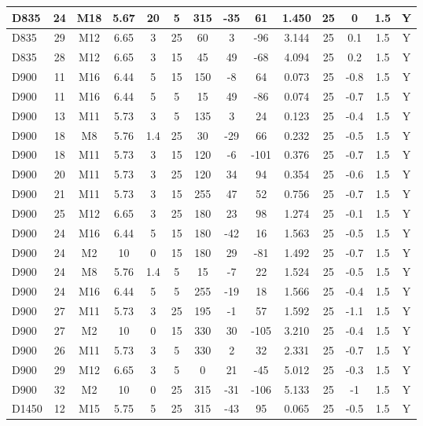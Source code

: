 \documentclass{article}
\begin{document}
\begin{center}
\begin{longtable}{|l|c|c|c|c|c|c|c|c|c|c|c|c|c|}
D835	&	24	&	M18	&	5.67	&	20	&	5	&	315	&	-35	&	61	&	1.450	&	25	&	0	&	1.5	&	Y	\\\hline
D835	&	29	&	M12	&	6.65	&	3	&	25	&	60	&	3	&	-96	&	3.144	&	25	&	0.1	&	1.5	&	Y	\\\hline
D835	&	28	&	M12	&	6.65	&	3	&	15	&	45	&	49	&	-68	&	4.094	&	25	&	0.2	&	1.5	&	Y	\\\hline
D900	&	11	&	M16	&	6.44	&	5	&	15	&	150	&	-8	&	64	&	0.073	&	25	&	-0.8	&	1.5	&	Y	\\\hline
D900	&	11	&	M16	&	6.44	&	5	&	5	&	15	&	49	&	-86	&	0.074	&	25	&	-0.7	&	1.5	&	Y	\\\hline
D900	&	13	&	M11	&	5.73	&	3	&	5	&	135	&	3	&	24	&	0.123	&	25	&	-0.4	&	1.5	&	Y	\\\hline
D900	&	18	&	M8	&	5.76	&	1.4	&	25	&	30	&	-29	&	66	&	0.232	&	25	&	-0.5	&	1.5	&	Y	\\\hline
D900	&	18	&	M11	&	5.73	&	3	&	15	&	120	&	-6	&	-101	&	0.376	&	25	&	-0.7	&	1.5	&	Y	\\\hline
D900	&	20	&	M11	&	5.73	&	3	&	25	&	120	&	34	&	94	&	0.354	&	25	&	-0.6	&	1.5	&	Y	\\\hline
D900	&	21	&	M11	&	5.73	&	3	&	15	&	255	&	47	&	52	&	0.756	&	25	&	-0.7	&	1.5	&	Y	\\\hline
D900	&	25	&	M12	&	6.65	&	3	&	25	&	180	&	23	&	98	&	1.274	&	25	&	-0.1	&	1.5	&	Y	\\\hline
D900	&	24	&	M16	&	6.44	&	5	&	15	&	180	&	-42	&	16	&	1.563	&	25	&	-0.5	&	1.5	&	Y	\\\hline
D900	&	24	&	M2	&	10	&	0	&	15	&	180	&	29	&	-81	&	1.492	&	25	&	-0.7	&	1.5	&	Y	\\\hline
D900	&	24	&	M8	&	5.76	&	1.4	&	5	&	15	&	-7	&	22	&	1.524	&	25	&	-0.5	&	1.5	&	Y	\\\hline
D900	&	24	&	M16	&	6.44	&	5	&	5	&	255	&	-19	&	18	&	1.566	&	25	&	-0.4	&	1.5	&	Y	\\\hline
D900	&	27	&	M11	&	5.73	&	3	&	25	&	195	&	-1	&	57	&	1.592	&	25	&	-1.1	&	1.5	&	Y	\\\hline
D900	&	27	&	M2	&	10	&	0	&	15	&	330	&	30	&	-105	&	3.210	&	25	&	-0.4	&	1.5	&	Y	\\\hline
D900	&	26	&	M11	&	5.73	&	3	&	5	&	330	&	2	&	32	&	2.331	&	25	&	-0.7	&	1.5	&	Y	\\\hline
D900	&	29	&	M12	&	6.65	&	3	&	5	&	0	&	21	&	-45	&	5.012	&	25	&	-0.3	&	1.5	&	Y	\\\hline
D900	&	32	&	M2	&	10	&	0	&	25	&	315	&	-31	&	-106	&	5.133	&	25	&	-1	&	1.5	&	Y	\\\hline
D1450	&	12	&	M15	&	5.75	&	5	&	25	&	315	&	-43	&	95	&	0.065	&	25	&	-0.5	&	1.5	&	Y	\\\hline

\end{longtable}
\end{center}
\end{document}
